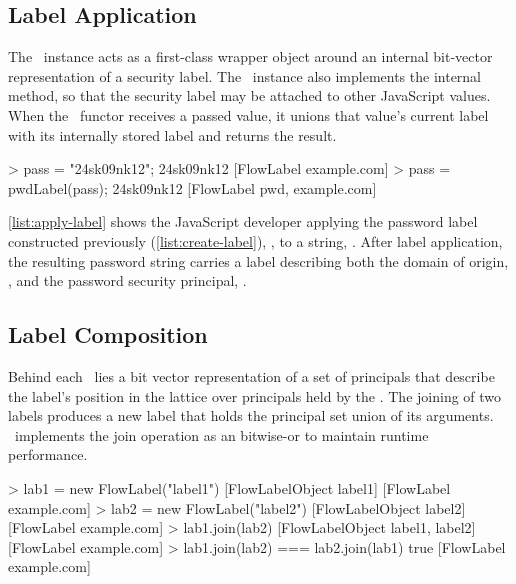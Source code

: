 \subsection{Label Application}

The \FlowLabelObject\ instance acts as a first-class wrapper object around an internal bit-vector representation of a security label.
The \FlowLabelObject\ instance also implements the internal  method, so that the security label may be attached to other JavaScript values.
When the \FlowLabelObject\ functor receives a passed value, it unions that value's current label with its internally stored label and returns the result.

\begin{jscode}
> pass = "24sk09nk12";
  24sk09nk12 [FlowLabel example.com]
> pass = pwdLabel(pass);
  24sk09nk12 [FlowLabel pwd, example.com]
\end{jscode}

\autoref{list:apply-label} shows the JavaScript developer applying the password label constructed previously (\autoref{list:create-label}), , to a string, .
After label application, the resulting password string carries a label describing both the domain of origin, , and the password security principal, .

\subsection{Label Composition}

Behind each \FlowLabelObject\ lies a bit vector representation of a set of principals that describe the label's position in the lattice over principals held by the \FlowLabelRegistry.
The joining of two labels produces a new label that holds the principal set union of its arguments.
\JitFlow\ implements the join operation as an bitwise-or to maintain runtime performance.

\begin{jscode}
> lab1 = new FlowLabel("label1")
  [FlowLabelObject label1] [FlowLabel example.com]
> lab2 = new FlowLabel("label2")
  [FlowLabelObject label2] [FlowLabel example.com]
> lab1.join(lab2)
  [FlowLabelObject label1, label2] [FlowLabel example.com]
> lab1.join(lab2) === lab2.join(lab1)
  true [FlowLabel example.com]
\end{jscode}

